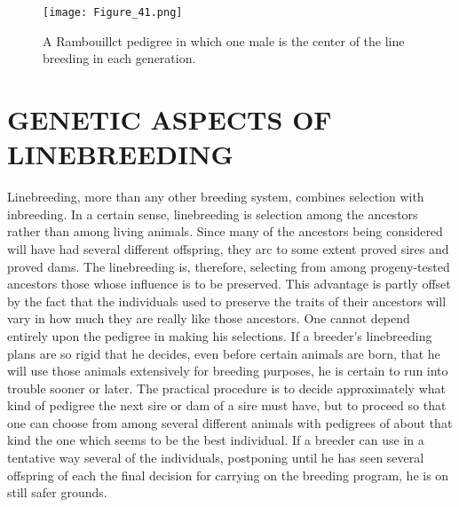 \begin{figure}
	\centering
    \texttt{[image: Figure\_41.png]}
    \caption{A Rambouillct pedigree in which one male is the center of the line breeding
			 in each generation.}
    \label{fig:Lush_Figure_41}
\end{figure}

\section*{GENETIC ASPECTS OF LINEBREEDING}

Linebreeding, more than any other breeding system, combines selection
with inbreeding. In a certain sense, linebreeding is selection among
the ancestors rather than among living animals. Since many of the
ancestors being considered will have had several different offspring,
they arc to some extent proved sires and proved dams. The linebreeding
is, therefore, selecting from among progeny-tested ancestors those
whose influence is to be preserved. This advantage is partly offset by the
fact that the individuals used to preserve the traits of their ancestors
will vary in how much they are really like those ancestors. One cannot
depend entirely upon the pedigree in making his selections. If a breeder's
linebreeding plans are so rigid that he decides, even before certain
animals are born, that he will use those animals extensively for breeding
purposes, he is certain to run into trouble sooner or later. The practical
procedure is to decide approximately what kind of pedigree the
next sire or dam of a sire must have, but to proceed so that one can
choose from among several different animals with pedigrees of about
that kind the one which seems to be the best individual. If a breeder
can use in a tentative way several of the individuals, postponing until
he has seen several offspring of each the final decision for carrying on
the breeding program, he is on still safer grounds.

